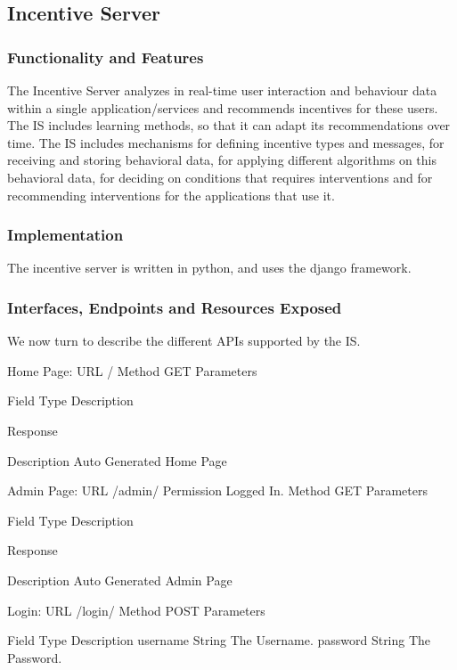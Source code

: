 \subsection{Incentive Server}
\subsubsection{Functionality and Features}
The Incentive Server analyzes in real-time user interaction and behaviour data within a single application/services  and recommends incentives for these  users. The IS includes learning methods, so that it can adapt its recommendations over time. The IS includes mechanisms for defining  incentive types and messages, for receiving and storing behavioral data, for applying different  algorithms on this behavioral data, for deciding on conditions that requires interventions and for  recommending interventions for the applications that use it. 
\subsubsection{Implementation}
The incentive server is written in python, and uses the django framework. 
\subsubsection{Interfaces, Endpoints and Resources Exposed}
We now turn to describe the different APIs supported by the IS. 

Home Page:
URL
/
Method
GET
Parameters

Field
Type
Description








Response


Description
Auto Generated Home Page


Admin Page:
URL
/admin/
Permission
Logged In.
Method
GET
Parameters

Field
Type
Description








Response


Description
Auto Generated  Admin Page

Login:
URL
/login/
Method
POST
Parameters

Field
Type
Description
username
String
The Username.
password
String
The Password.


